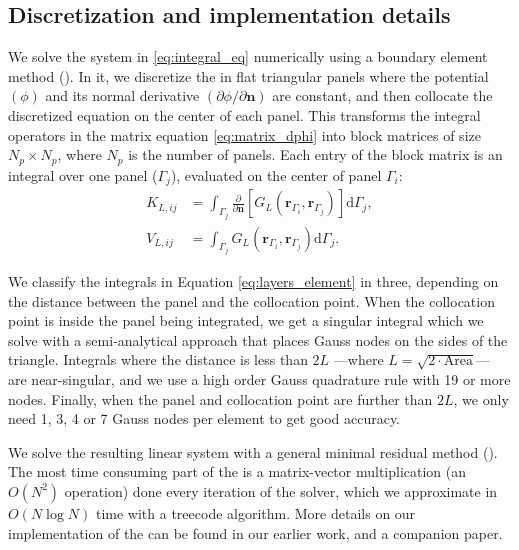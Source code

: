 

\subsection{Discretization and implementation details}

We solve the system in \eqref{eq:integral_eq} numerically using a boundary element method (\bem). In it, we discretize the \ses in flat triangular panels where the potential $(\phi)$ and its normal derivative $(\partial \phi /\partial \mathbf{n})$ are constant, and then collocate the discretized equation on the center of each panel. This transforms the integral operators in the matrix equation \eqref{eq:matrix_dphi} into block matrices of size $N_p \times N_p$, where $N_p$ is the number of panels. Each entry of the block matrix is an integral over one panel ($\Gamma_j$), evaluated on the center of panel $\Gamma_i$:
%
\begin{align} \label{eq:layers_element}
K_{L,ij} &= \int_{\Gamma_j} \frac{\partial}{\partial \mathbf{n}} \left[ G_L(\mathbf{r}_{\Gamma_i},\mathbf{r}_{\Gamma_j}) \right]\mathrm{d} \Gamma_j, \nonumber \\
V_{L,ij} &= \int_{\Gamma_j} G_L(\mathbf{r}_{\Gamma_i},\mathbf{r}_{\Gamma_j})  \mathrm{d} \Gamma_j.
\end{align}

We classify the integrals in Equation \eqref{eq:layers_element} in three, depending on the distance between the panel and the collocation point. 
When the collocation point is inside the panel being integrated, we get a singular integral which we solve with a semi-analytical approach\cite{ZhuHuangSongWhite2001} that places Gauss nodes on the sides of the triangle. 
Integrals where the distance is less than $2L$ ---where $L = \sqrt{2\cdot \text{Area}}$--- are near-singular, and we use a high order Gauss quadrature rule with 19 or more nodes. 
Finally, when the panel and collocation point are further than $2L$, we only need 1, 3, 4 or 7 Gauss nodes per element to get good accuracy.

We solve the resulting linear system with a general minimal residual method (\gmres). The most time consuming part of the \gmres is a matrix-vector multiplication (an $O(N^2)$ operation) done every iteration of the solver, which we approximate in $O(N\log N)$ time with a treecode algorithm\cite{BarnesHut1986}. More details on our implementation of the \bem can be found in our earlier work,\cite{CooperBarba-share154331} and a companion paper.\cite{CooperBarba2015a}
